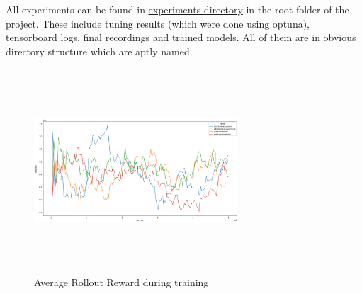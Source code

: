 \documentclass[english]{sobraep}
\begin{document}
All experiments can be found in \href{https://github.com/thunderock/BiasNet/tree/master/experiments}{experiments directory} in the root folder of the project. These include tuning results (which were done using optuna), tensorboard logs, final recordings and trained models. All of them are in obvious directory structure which are aptly named.

\begin{figure}
	\includegraphics[width=3in, height=3in]{training.png}
	\centering
	\caption{Average Rollout Reward during training}
	\label{fig:fig4}
\end{figure}
\end{document}
